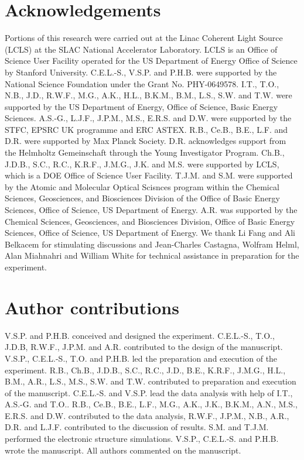 \documentclass[10pt]{article}
\begin{document}
\section*{Acknowledgements}
Portions of this research were carried out at the Linac Coherent Light Source (LCLS) at the SLAC National Accelerator Laboratory. LCLS is an Office of Science User Facility operated for the US Department of Energy Office of Science by Stanford University. C.E.L.-S., V.S.P. and P.H.B. were supported by the National Science Foundation under the Grant No. PHY-0649578. I.T., T.O., N.B., J.D., R.W.F., M.G., A.K., H.L., B.K.M., B.M., L.S., S.W. and T.W. were supported by the US Department of Energy, Office of Science, Basic Energy Sciences. A.S.-G., L.J.F., J.P.M., M.S., E.R.S. and D.W. were supported by the STFC, EPSRC UK programme and ERC ASTEX. R.B., Ce.B., B.E., L.F. and D.R. were supported by Max Planck Society. D.R. acknowledges support from the Helmholtz Gemeinschaft through the Young Investigator Program. Ch.B., J.D.B., S.C., R.C., K.R.F., J.M.G., J.K. and M.S. were supported by LCLS, which is a DOE Office of Science User Facility. T.J.M. and S.M. were supported by the Atomic and Molecular Optical Scisnces program within the Chemical Sciences, Geosciences, and Biosciences Division of the Office of Basic Energy Sciences, Office of Science, US Department of Energy. A.R. was supported by the Chemical Sciences, Geosciences, and Biosciences Division, Office of Basic Energy Sciences, Office of Science, US Department of Energy. We thank Li Fang and Ali Belkacem for stimulating discussions and Jean-Charles Castagna, Wolfram Helml, Alan Miahnahri and William White for technical assistance in preparation for the experiment.

\section*{Author contributions}
V.S.P. and P.H.B. conceived and designed the experiment. C.E.L.-S., T.O., J.D.B, R.W.F., J.P.M. and A.R. contributed to the design of the manuscript. V.S.P., C.E.L.-S., T.O. and P.H.B. led the preparation and execution of the experiment. R.B., Ch.B., J.D.B., S.C., R.C., J.D., B.E., K.R.F., J.M.G., H.L., B.M., A.R., L.S., M.S., S.W. and T.W. contributed to preparation and execution of the manuscript. C.E.L.-S. and V.S.P. lead the data analysis with help of I.T., A.S.-G. and T.O.. R.B., Ce.B., B.E., L.F., M.G., A.K., J.K., B.K.M., A.N., M.S., E.R.S. and D.W. contributed to the data analysis, R.W.F., J.P.M., N.B., A.R., D.R. and L.J.F. contributed to the discussion of results. S.M. and T.J.M. performed the electronic structure simulations. V.S.P., C.E.L.-S. and P.H.B. wrote the manuscript. All authors commented on the manuscript.
\end{document}
